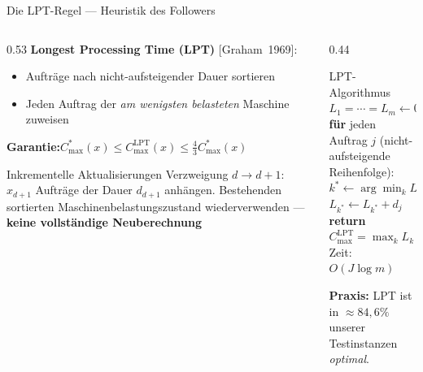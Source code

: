 \documentclass[fleqn,11pt,aspectratio=43]{beamer}
\newcommand{\Copt}{C_{\max}^{*}}
\newcommand{\Clpt}{C_{\max}^{\mathrm{LPT}}}
\begin{document}
\begin{frame}[shrink=18]{Die LPT-Regel — Heuristik des Followers}
  \begin{columns}[T]
    \begin{column}{0.53\textwidth}
      \textbf{Longest Processing Time (LPT)} [Graham~1969]:
      \begin{itemize}
        \item Aufträge nach nicht-aufsteigender Dauer sortieren
        \item Jeden Auftrag der \emph{am wenigsten belasteten} Maschine zuweisen
      \end{itemize}
      \textbf{Garantie:}\quad $\Copt(x)\leq\Clpt(x)\leq\tfrac{4}{3}\Copt(x)$
      \begin{alertblock}{Inkrementelle Aktualisierungen}
        Verzweigung $d\to d{+}1$: $x_{d+1}$ Aufträge der Dauer $d_{d+1}$ anhängen.
        Bestehenden sortierten Maschinenbelastungszustand wiederverwenden — \textbf{keine vollständige Neuberechnung}
      \end{alertblock}
    \end{column}
    \begin{column}{0.44\textwidth}
      \begin{block}{LPT-Algorithmus}
        \footnotesize
        $L_1=\cdots=L_m\leftarrow 0$\\[0.15em]
        \textbf{für} jeden Auftrag $j$ (nicht-aufsteigende Reihenfolge):\\
        \quad $k^*\leftarrow\arg\min_k L_k$\\
        \quad $L_{k^*}\leftarrow L_{k^*}+d_j$\\[0.15em]
        \textbf{return} $\Clpt=\max_k L_k$\\[0.2em]
        \normalsize Zeit: $O(J\log m)$
      \end{block}
      \textbf{Praxis:} LPT ist in $\approx84,6\%$ unserer Testinstanzen \emph{optimal}.
    \end{column}
  \end{columns}
\end{frame}
\end{document}
